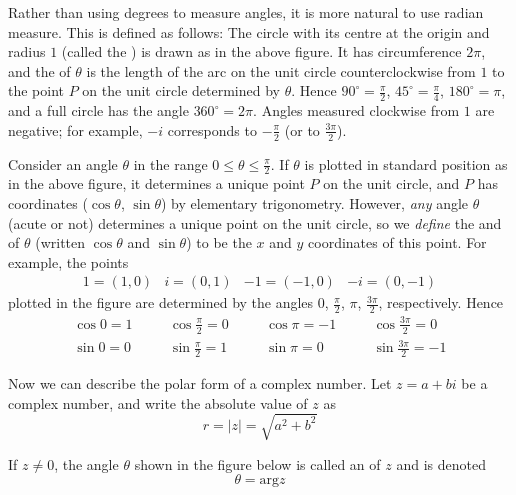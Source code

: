 \documentclass{ximera}
\begin{document}
 
 Rather than using degrees to measure angles, it is more natural to use
radian measure. This is defined as follows: The circle with its centre
at the origin and radius $1$ (called the ) is drawn as in the above figure. It has circumference $2\pi$, and the  of $\theta$ is the length of the arc on the unit circle counterclockwise from $1$ to the point $P$ on the unit circle determined by $\theta$. Hence $90^{\circ} = \frac{\pi}{2}$, $45^{\circ}  = \frac{\pi}{4}$, $180^{\circ}  = \pi$, and a full circle has the angle $360^{\circ}  = 2\pi$. Angles measured clockwise from $1$ are negative; for example, $-i$ corresponds to $-\frac{\pi}{2}$ (or to $\frac{3\pi}{2}$).

Consider an angle $\theta$ in the range $0 \leq \theta \leq \frac{\pi}{2}$. If $\theta$ is plotted in standard position as in the above figure, it determines a unique point $P$ on the unit circle, and $P$ has coordinates ($\cos \theta$, $\sin \theta$) by elementary trigonometry. However, \textit{any} angle $\theta$ (acute or not) determines a unique point on the unit circle, so we \textit{define} the  and  of $\theta$ (written $\cos \theta$ and $\sin \theta$) to be the $x$ and $y$ coordinates of this point. For example, the points
\begin{equation*}
\begin{array}{llll}
1=(1,0) & i=(0,1) & -1=(-1,0) & -i=(0,-1)
\end{array}
\end{equation*}
plotted in the figure are determined by the angles $0$, $\frac{\pi}{2}$, $\pi$, $\frac{3\pi}{2}$, respectively. Hence
\begin{equation*}
\begin{array}{lllllll}
\cos 0 = 1 & \quad & \cos \frac{\pi}{2} = 0 & \quad & \cos \pi = -1 & \quad & \cos \frac{3\pi}{2} = 0\\
\sin 0 = 0 & & \sin \frac{\pi}{2} = 1 & & \sin \pi = 0 & &\sin \frac{3\pi}{2} = -1
\end{array}
\end{equation*}

Now we can describe the polar form of a complex number. Let $z = a + bi$ be a complex number, and write the absolute value of $z$ as
\begin{equation*}
r = |z| = \sqrt{a^2+b^2}
\end{equation*}

If $z \neq 0$, the angle $\theta$ shown in the figure below is called an  of $z$ and is denoted
\begin{equation*}
\theta = \mbox{arg} z
\end{equation*}
\end{document}
